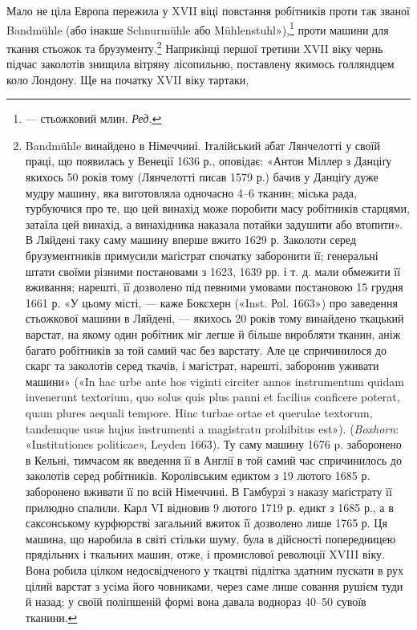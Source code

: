 Мало не ціла Европа пережила у XVII віці повстання робітників
проти так званої Bandmühle (або інакше Schnurmühle
або Mühlenstuhl»),\footnote*{
— стьожковий млин. \emph{Ред.}
} проти машини для ткання стьожок та брузументу.\footnote{
Bandmühle винайдено в Німеччині. Італійський абат Лянчелотті
у своїй праці, що появилась у Венеції 1636 р., оповідає: «Антон Міллер
з Данціґу якихось 50 років тому (Лянчелотті писав 1579 р.) бачив у Данціґу
дуже мудру машину, яка виготовляла одночасно 4--6 тканин; міська
рада, турбуючися про те, що цей винахід може поробити масу робітників
старцями, затаїла цей винахід, а винахідника наказала потайки задушити
або втопити». В Ляйдені таку саму машину вперше вжито 1629 р. Заколоти
серед брузументників примусили маґістрат спочатку заборонити її;
генеральні штати своїми різними постановами з 1623, 1639 рр. і т. д.
мали обмежити її вживання; нарешті, її дозволено під певними умовами
постановою 15 грудня 1661 р. «У цьому місті, — каже Боксхерн («Inst.
Роl. 1663») про заведення стьожкової машини в Ляйдені, — якихось 20 років
тому винайдено ткацький варстат, на якому один робітник міг легше й
більше виробляти тканин, аніж багато робітників за той самий час без
варстату. Але це спричинилося до скарг та заколотів серед ткачів, і магістрат,
нарешті, заборонив уживати машини» («In hac urbe ante hos viginti
circiter annos instrumentum quidam invenerunt textorium, quo solus quis
plus panni et facilius conficere poterat, quam plures aequali tempore. Hinc
turbae ortae et querulae textorum, tandemque usus hujus instrumenti a
magistratu prohibitus est»). (\emph{Boxhorn}: «Institutiones politicae», Leyden
1663). Ту саму машину 1676 p. заборонено в Кельні, тимчасом як введення
її в Англії в той самий час спричинилось до заколотів серед робітників.
Королівським едиктом з 19 лютого 1685 р. заборонено вживати її по всій
Німеччині. В Гамбурзі з наказу маґістрату її прилюдно спалили. Карл VI
відновив 9 лютого 1719 р. едикт з 1685 р., а в саксонському курфюрстві
загальний вжиток її дозволено лише 1765 р. Ця машина, що наробила в
світі стільки шуму, була в дійсності попередницею прядільних і ткальних
машин, отже, і промислової революції XVIII віку. Вона робила цілком
недосвідченого у ткацтві підлітка здатним пускати в рух цілий
варстат з усіма його човниками, через саме лише совання рушієм туди
й назад; у своїй поліпшеній формі вона давала воднораз 40--50 сувоїв
тканини.
} Наприкінці першої третини XVII віку чернь підчас
заколотів знищила вітряну лісопильню, поставлену якимось голляндцем
коло Лондону. Ще на початку XVII віку тартаки,
